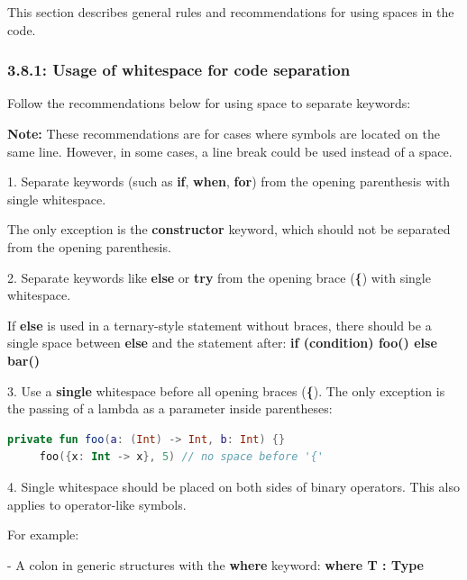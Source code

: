 \label{sec:3.8}

This section describes general rules and recommendations for using spaces in the code.

\subsubsection*{\textbf{3.8.1: Usage of whitespace for code separation}}
\leavevmode\newline

\label{sec:3.8.1}



Follow the recommendations below for using space to separate keywords:



\textbf{Note:} These recommendations are for cases where symbols are located on the same line. However, in some cases, a line break could be used instead of a space.



1.  Separate keywords (such as \textbf{if}, \textbf{when}, \textbf{for}) from the opening parenthesis with single whitespace.

    The only exception is the \textbf{constructor} keyword, which should not be separated from the opening parenthesis.



2.  Separate keywords like \textbf{else} or \textbf{try} from the opening brace (\textbf{\{}) with single whitespace.

    If \textbf{else} is used in a ternary-style statement without braces, there should be a single space between \textbf{else} and the statement after: \textbf{if (condition) foo() else bar()}



3.  Use a \textbf{single} whitespace before all opening braces (\textbf{\{}). The only exception is the passing of a lambda as a parameter inside parentheses:

\begin{lstlisting}[language=Kotlin]
     private fun foo(a: (Int) -> Int, b: Int) {}
     foo({x: Int -> x}, 5) // no space before '{'
\end{lstlisting}


4.  Single whitespace should be placed on both sides of binary operators. This also applies to operator-like symbols.

    For example: 

    

 - A colon in generic structures with the \textbf{where} keyword:  \textbf{where T : Type}


